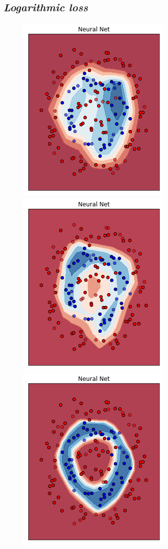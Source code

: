 \documentclass[12pt,a4paper]{report}
\begin{document}
\subsection{\textit{Logarithmic loss}}

\begin{figure}[H]
 \centering
 \includegraphics[scale = 0.3]{images/circle+-rnd-log./1}
 \includegraphics[scale = 0.3]{images/circle+-rnd-log./2}
 \includegraphics[scale = 0.3]{images/circle+-rnd-log./3}

\end{figure}
\end{document}
